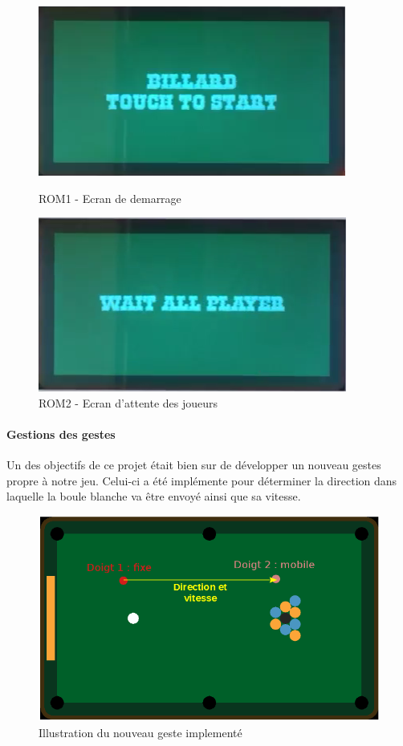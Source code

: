 \begin{figure}[!ht]
   \begin{minipage}[c]{.46\linewidth}
      \includegraphics[scale=0.65]{img/start.png}
      \caption{ROM1 - Ecran de demarrage}
      \label{fig3}
   \end{minipage} \hfill
   \begin{minipage}[c]{.46\linewidth}
      \includegraphics[scale=0.65]{img/Wait_all_player.png}
      \caption{ROM2 - Ecran d'attente des joueurs
      \label{fig4}}
   \end{minipage}
\end{figure}

\paragraph{Gestions des gestes}

Un des objectifs de ce projet était bien sur de développer un nouveau gestes propre à notre jeu. Celui-ci a été implémente pour déterminer la direction dans laquelle la boule blanche va être envoyé ainsi que sa vitesse. 

\begin{figure}[!ht]
\centering
\includegraphics[scale=0.6]{img/gesture.png}
\caption{Illustration du nouveau geste implementé}
\label{fig5}
\end{figure}

